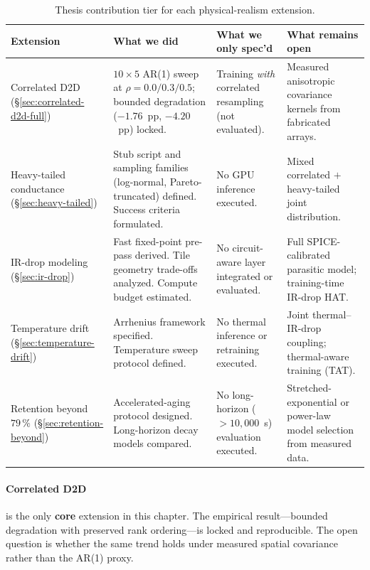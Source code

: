 \begin{table}[ht]
    \centering
    \caption{Thesis contribution tier for each physical-realism extension.}
    \label{tab:tier-mapping}
    \small
    \setlength{\tabcolsep}{4pt}
    \begin{tabular}{@{}lp{4.2cm}p{4.2cm}p{3.8cm}@{}}
        \toprule
        \textbf{Extension} & \textbf{What we did} & \textbf{What we only spec'd} & \textbf{What remains open} \\
        \midrule
        Correlated D2D (\S\ref{sec:correlated-d2d-full}) & $10 \times 5$ AR(1) sweep at $\rho=0.0/0.3/0.5$; bounded degradation ($-1.76$~pp, $-4.20$~pp) locked. & Training \emph{with} correlated resampling (not evaluated). & Measured anisotropic covariance kernels from fabricated arrays. \\
        \addlinespace
        Heavy-tailed conductance (\S\ref{sec:heavy-tailed}) & Stub script and sampling families (log-normal, Pareto-truncated) defined. Success criteria formulated. & No GPU inference executed. & Mixed correlated $+$ heavy-tailed joint distribution. \\
        \addlinespace
        IR-drop modeling (\S\ref{sec:ir-drop}) & Fast fixed-point pre-pass derived. Tile geometry trade-offs analyzed. Compute budget estimated. & No circuit-aware layer integrated or evaluated. & Full SPICE-calibrated parasitic model; training-time IR-drop HAT. \\
        \addlinespace
        Temperature drift (\S\ref{sec:temperature-drift}) & Arrhenius framework specified. Temperature sweep protocol defined. & No thermal inference or retraining executed. & Joint thermal--IR-drop coupling; thermal-aware training (TAT). \\
        \addlinespace
        Retention beyond $79\,\%$ (\S\ref{sec:retention-beyond}) & Accelerated-aging protocol designed. Long-horizon decay models compared. & No long-horizon ($>10{,}000$~s) evaluation executed. & Stretched-exponential or power-law model selection from measured data. \\
        \bottomrule
    \end{tabular}
\end{table}

\paragraph{Correlated D2D} is the only \textbf{core} extension in this chapter.  The empirical result---bounded degradation with preserved rank ordering---is locked and reproducible.  The open question is whether the same trend holds under measured spatial covariance rather than the AR(1) proxy.


